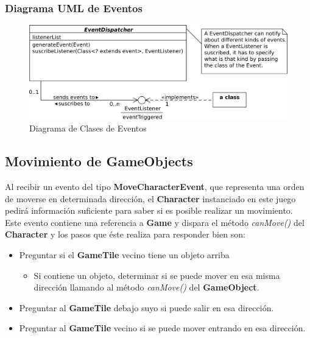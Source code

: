 \documentclass[a4paper,12pt,titlepage]{article}
\begin{document}
\subsubsection{Diagrama UML de Eventos}

\begin{center}
	\begin{figure}[h]
		\center \includegraphics{EventClassDiagram.png}
		\caption{Diagrama de Clases de Eventos}
	\end{figure}
\end{center}

\subsection{Movimiento de \textbf{GameObjects}}

Al recibir un evento del tipo \textbf{MoveCharacterEvent}, que representa una orden de moverse en determinada dirección, el \textbf{Character} instanciado en este juego pedirá información suficiente para saber si es posible realizar un movimiento.
Este evento contiene una referencia a \textbf{Game} y dispara el método \emph{canMove()} del \textbf{Character} y los pasos que éste realiza para responder bien son:

\begin{itemize}
 \item Preguntar si el \textbf{GameTile} vecino tiene un objeto arriba
 \begin{itemize}
  \item Si contiene un objeto, determinar si se puede mover en esa misma dirección llamando al método \textit{canMove()} del \textbf{GameObject}.
 \end{itemize}
 \item Preguntar al \textbf{GameTile} debajo suyo si puede salir en esa dirección.
 \item Preguntar al \textbf{GameTile} vecino si se puede mover entrando en esa dirección.
\end{itemize}
\end{document}

